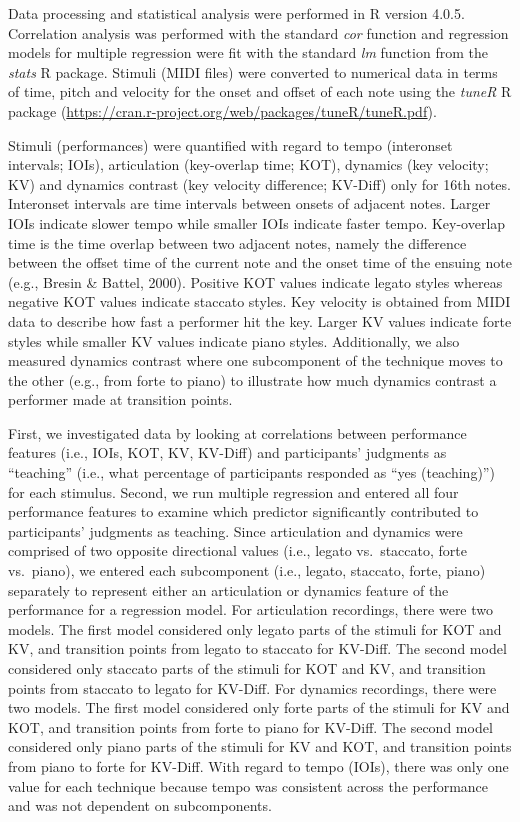 \documentclass[
  man,floatsintext]{apa6}
\begin{document}
Data processing and statistical analysis were performed in R version 4.0.5. Correlation analysis was performed with the standard \emph{cor} function and regression models for multiple regression were fit with the standard \emph{lm} function from the \emph{stats} R package. Stimuli (MIDI files) were converted to numerical data in terms of time, pitch and velocity for the onset and offset of each note using the \emph{tuneR} R package (\url{https://cran.r-project.org/web/packages/tuneR/tuneR.pdf}).

Stimuli (performances) were quantified with regard to tempo (interonset intervals; IOIs), articulation (key-overlap time; KOT), dynamics (key velocity; KV) and dynamics contrast (key velocity difference; KV-Diff) only for 16th notes. Interonset intervals are time intervals between onsets of adjacent notes. Larger IOIs indicate slower tempo while smaller IOIs indicate faster tempo. Key-overlap time is the time overlap between two adjacent notes, namely the difference between the offset time of the current note and the onset time of the ensuing note (e.g., Bresin \& Battel, 2000). Positive KOT values indicate legato styles whereas negative KOT values indicate staccato styles. Key velocity is obtained from MIDI data to describe how fast a performer hit the key. Larger KV values indicate forte styles while smaller KV values indicate piano styles. Additionally, we also measured dynamics contrast where one subcomponent of the technique moves to the other (e.g., from forte to piano) to illustrate how much dynamics contrast a performer made at transition points.

First, we investigated data by looking at correlations between performance features (i.e., IOIs, KOT, KV, KV-Diff) and participants' judgments as ``teaching'' (i.e., what percentage of participants responded as ``yes (teaching)'') for each stimulus. Second, we run multiple regression and entered all four performance features to examine which predictor significantly contributed to participants' judgments as teaching. Since articulation and dynamics were comprised of two opposite directional values (i.e., legato vs.~staccato, forte vs.~piano), we entered each subcomponent (i.e., legato, staccato, forte, piano) separately to represent either an articulation or dynamics feature of the performance for a regression model. For articulation recordings, there were two models. The first model considered only legato parts of the stimuli for KOT and KV, and transition points from legato to staccato for KV-Diff. The second model considered only staccato parts of the stimuli for KOT and KV, and transition points from staccato to legato for KV-Diff. For dynamics recordings, there were two models. The first model considered only forte parts of the stimuli for KV and KOT, and transition points from forte to piano for KV-Diff. The second model considered only piano parts of the stimuli for KV and KOT, and transition points from piano to forte for KV-Diff. With regard to tempo (IOIs), there was only one value for each technique because tempo was consistent across the performance and was not dependent on subcomponents.
\end{document}
